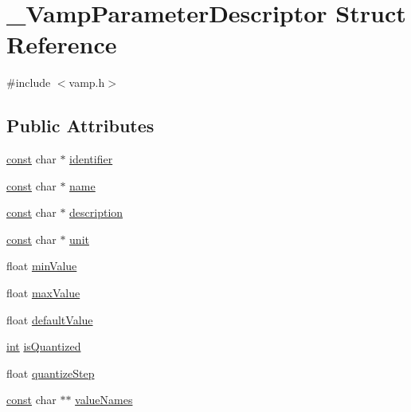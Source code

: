 \hypertarget{struct___vamp_parameter_descriptor}{}\section{\+\_\+\+Vamp\+Parameter\+Descriptor Struct Reference}
\label{struct___vamp_parameter_descriptor}


{\ttfamily \#include $<$vamp.\+h$>$}

\subsection*{Public Attributes}
\begin{DoxyCompactItemize}
\item 
\hyperlink{getopt1_8c_a2c212835823e3c54a8ab6d95c652660e}{const} char $\ast$ \hyperlink{struct___vamp_parameter_descriptor_a26d74afd6a3341a673f15955031845ab}{identifier}
\item 
\hyperlink{getopt1_8c_a2c212835823e3c54a8ab6d95c652660e}{const} char $\ast$ \hyperlink{struct___vamp_parameter_descriptor_abba810bce9656f6002777f6c3f655957}{name}
\item 
\hyperlink{getopt1_8c_a2c212835823e3c54a8ab6d95c652660e}{const} char $\ast$ \hyperlink{struct___vamp_parameter_descriptor_a95489272d6cf5a5b487e949da8e4fac6}{description}
\item 
\hyperlink{getopt1_8c_a2c212835823e3c54a8ab6d95c652660e}{const} char $\ast$ \hyperlink{struct___vamp_parameter_descriptor_a8ca235f816b56dc99125e010eee08fc7}{unit}
\item 
float \hyperlink{struct___vamp_parameter_descriptor_ab59c84f0bbe0d4d0c578d893c087b0db}{min\+Value}
\item 
float \hyperlink{struct___vamp_parameter_descriptor_a6e7646babdb265c4abfc107ba4350d80}{max\+Value}
\item 
float \hyperlink{struct___vamp_parameter_descriptor_a3d37f986ee152ab55feb9902b35f7aca}{default\+Value}
\item 
\hyperlink{xmltok_8h_a5a0d4a5641ce434f1d23533f2b2e6653}{int} \hyperlink{struct___vamp_parameter_descriptor_a3f41e3b6b69c7a95ff0ce8625794f83a}{is\+Quantized}
\item 
float \hyperlink{struct___vamp_parameter_descriptor_a68c91fd3fc0b0b3617c2d343fe32d0e5}{quantize\+Step}
\item 
\hyperlink{getopt1_8c_a2c212835823e3c54a8ab6d95c652660e}{const} char $\ast$$\ast$ \hyperlink{struct___vamp_parameter_descriptor_a188883325ab1e4a898e3dc53a8f88f9d}{value\+Names}
\end{DoxyCompactItemize}


